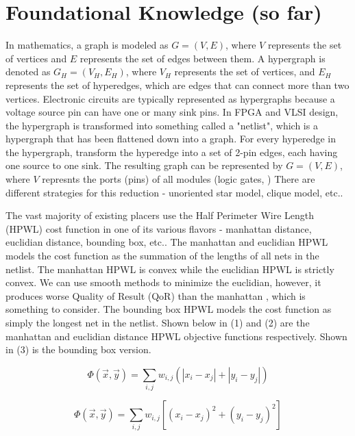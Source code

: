 \documentclass{article}
\begin{document}
\section{Foundational Knowledge (so far)}
    In mathematics, a graph is modeled as \( G = (V, E) \), where \( V \) represents the set of vertices and \( E \) represents the set of edges between them.
    A hypergraph is denoted as \( G_{H} = (V_{H}, E_{H}) \), where \( V_{H} \) represents the set of vertices, and \( E_{H} \) represents the set of hyperedges, which are edges that can connect more than two vertices.
    Electronic circuits are typically represented as hypergraphs because a voltage source pin can have one or many sink pins. 
    In FPGA and VLSI design, the hypergraph is transformed into something called a "netlist", which is a hypergraph that has been flattened down into a graph. 
    For every hyperedge in the hypergraph, transform the hyperedge into a set of 2-pin edges, each having one source to one sink.
    The resulting graph can be represented by \( G = (V, E) \), where \( V \) represnts the ports (pins) of all modules (logic gates, )
    There are different strategies for this reduction - unoriented star model, clique model, etc.. 
    \cite{AP_2000}

    The vast majority of existing placers use the Half Perimeter Wire Length (HPWL) cost function in one of its various flavors - manhattan distance, euclidian distance, bounding box, etc..
    The manhattan and euclidian HPWL models the cost function as the summation of the lengths of all nets in the netlist. 
    The manhattan HPWL is convex while the euclidian HPWL is strictly convex.
    We can use smooth methods to minimize the euclidian, however, it produces worse Quality of Result (QoR) than the manhattan \cite{AP_2012}, which is something to consider.
    The bounding box HPWL models the cost function as simply the longest net in the netlist.
    Shown below in (1) and (2) are the manhattan and euclidian distance HPWL objective functions respectively.
    Shown in (3) is the bounding box version.

    \begin{equation}
        \Phi(\vec{x}, \vec{y}) = \sum_{i,j} w_{i,j} \left( |x_i - x_j| + |y_i - y_j| \right)
        \label{Manhattan}
    \end{equation}

    \begin{equation}
        \Phi(\vec{x}, \vec{y}) = \sum_{i,j} w_{i,j} \left[ (x_i - x_j)^2 + (y_i - y_j)^2 \right]
        \label{Euclidian}
    \end{equation}
\end{document}
